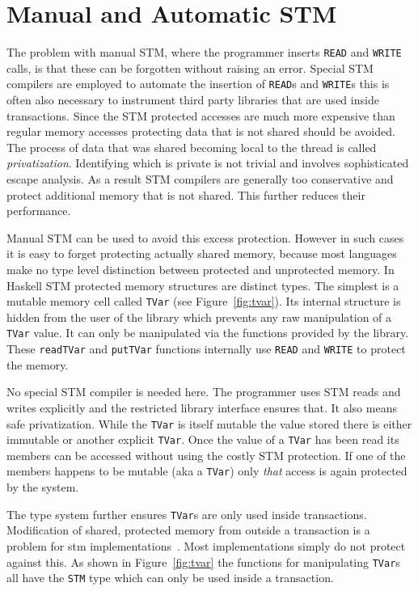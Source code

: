 \section{Manual and Automatic STM}

\label{sec:explicit-implicit}

The problem with manual STM, where the programmer inserts \texttt{READ} and
\texttt{WRITE} calls, is that these can be forgotten without raising an error.
Special STM compilers are employed to automate the insertion of \texttt{READ}s
and \texttt{WRITE}s this is often also necessary to instrument third party
libraries that are used inside transactions. Since the STM protected accesses
are much more expensive than regular memory accesses protecting data that is not
shared should be avoided. The process of data that was shared becoming local to
the thread is called \emph{privatization}. Identifying which is private is not
trivial and involves sophisticated escape analysis. As a result STM compilers
are generally too conservative and protect additional memory that is not shared.
This further reduces their performance.

Manual STM can be used to avoid this excess protection. However in such cases it
is easy to forget protecting actually shared memory, because most languages make
no type level distinction between protected and unprotected memory. In Haskell
STM protected memory structures are distinct types. The simplest is a mutable
memory cell called \texttt{TVar} (see Figure~\ref{fig:tvar}). Its internal
structure is hidden from the user of the library which prevents any raw
manipulation of a \texttt{TVar} value. It can only be manipulated via the
functions provided by the library. These \texttt{readTVar} and \texttt{putTVar}
functions internally use \texttt{READ} and \texttt{WRITE} to protect the memory.

No special STM compiler is needed here. The programmer uses STM reads and writes
explicitly and the restricted library interface ensures that. It also means safe
privatization. While the \texttt{TVar} is itself mutable the value stored there
is either immutable or another explicit \texttt{TVar}. Once the value of a
\texttt{TVar} has been read its members can be accessed without using the costly
STM protection. If one of the members happens to be mutable (aka a
\texttt{TVar}) only \emph{that} access is again protected by the system.

The type system further ensures \texttt{TVar}s are only used inside
transactions. Modification of shared, protected memory from outside a
transaction is a problem for stm implementations~\cite{research-toy}. Most
implementations simply do not protect against this. As shown in
Figure~\ref{fig:tvar} the functions for manipulating \texttt{TVar}s all have the
\texttt{STM} type which can only be used inside a transaction.

